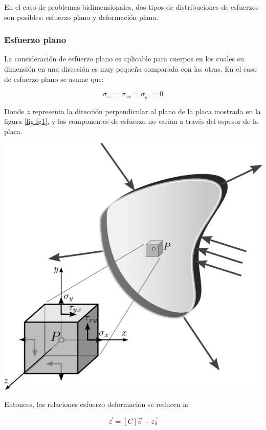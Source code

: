 En el caso de problemas bidimensionales, dos tipos de distribuciones de esfuerzos son posibles: esfuerzo plano 
y deformación plana.

\subsubsection{Esfuerzo plano}

La consideración de esfuerzo plano es aplicable para cuerpos en los cuales su dimensión en una dirección es muy 
pequeña comparada con las otras. En el caso de esfuerzo plano se asume que:

\begin{equation}
\sigma_{zz} = \sigma_{zx} = \sigma_{yz} = 0
\end{equation}

Donde $z$ representa la dirección perpendicular al plano de la placa mostrada en la figura \ref{fig:fg1}, 
y los componentes de esfuerzo no varían a través del espesor de la placa.

\begin{center}
\includegraphics[scale=0.35]{src/plane_stress.png}
\label{fig:fg1}
\end{center}

Entonces, las relaciones esfuerzo deformación se reducen a:

\begin{equation}
\vec{\varepsilon} = [C] \vec{\sigma} + \vec{\varepsilon_0}
\end{equation}

